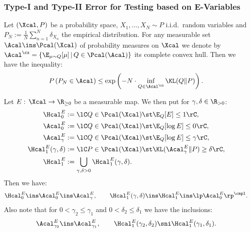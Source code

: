 \subsubsection{Type-I and Type-II Error for Testing based on E-Variables}


\begin{Thm}
    \label{sanov}
    Let $(\Xcal,P)$ be a probability space,  $X_1,\dots,X_N \sim P$ i.i.d.\ random variables and $P_N:=\frac{1}{N} \sum_{n=1}^N \delta_{X_n}$ the empirical distribution. 
    For any measurable set $\Acal \ins \Pcal(\Xcal)$ of probability measures on $\Xcal$ we denote by $\Acal^\cx=\{\E_{\mu \sim Q}[\mu]\,|\,Q \in \Pcal(\Acal) \}$ its complete convex hull.
    Then we have the inequality:
    \[ P\left( P_N \in \Acal \right) \le \exp\left( -N \cdot \inf_{Q \in \Acal^\cx} \KL(Q\|P) \right).   \]
\end{Thm}


\begin{Not}
    Let $E:\, \Xcal \to \R_{\ge0}$ be a measurable map. We then put for $\gamma, \delta \in \R_{>0}$:
    \begin{align*}
        \Hcal_0^E & := \lC Q \in \Pcal(\Xcal) \st \E_Q[E] \le 1 \rC,\\
        \Acal_0^E & := \lC Q \in \Pcal(\Xcal) \st \E_Q[\log E] \le 0 \rC,\\
        \Acal_\gamma^E & := \lC Q \in \Pcal(\Xcal) \st \E_Q[\log E] \le \gamma \rC,\\
        \Hcal_{1}^E(\gamma,\delta) & := \lC P \in \Pcal(\Xcal) \st \KL(\Acal_\gamma^E \|P) \ge \delta \rC,\\
        \Hcal^E_1& := \bigcup_{\gamma,\delta >0} \Hcal_{1}^E(\gamma,\delta).
    \end{align*}
    Then we have:
    \[  \Hcal_0^E \ins \Acal_0^E \ins \Acal_\gamma^E, \qquad \Hcal_{1}^E(\gamma,\delta) \ins \Hcal_1^E \ins \lp \Acal_0^E \rp^\cmpl.  \]
    Also note that for $0<\gamma_2 \le \gamma_1$ and $0<\delta_2 \le \delta_1$ we have the inclusions:
    \[ \Acal_{\gamma_2}^E  \ins \Acal_{\gamma_1}^E, \qquad \Hcal_{1}^E(\gamma_2,\delta_2)  \sni \Hcal_{1}^E(\gamma_1,\delta_1).   \]
\end{Not}



